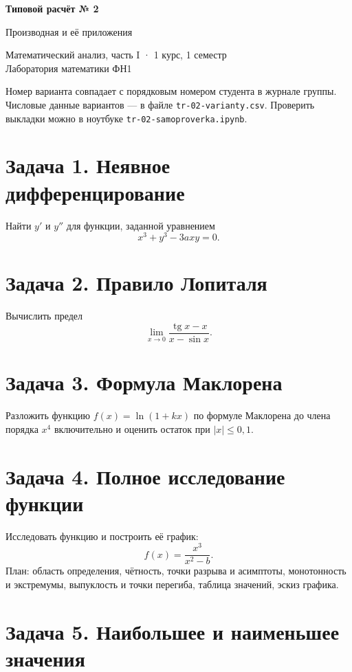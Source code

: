 \documentclass[12pt, a4paper]{article}
\begin{document}
\begin{center}
  {\large\bfseries Типовой расчёт № 2}

  \vspace{0.3em}
  {\large Производная и её приложения}

  \vspace{0.5em}
  {\small Математический анализ, часть I · 1 курс, 1 семестр\\
  Лаборатория математики ФН1}
\end{center}

\vspace{1em}

\noindent
Номер варианта совпадает с порядковым номером студента в журнале группы.
Числовые данные вариантов — в файле \texttt{tr-02-varianty.csv}.
Проверить выкладки можно в ноутбуке \texttt{tr-02-samoproverka.ipynb}.

\section*{Задача 1. Неявное дифференцирование}

Найти $y'$ и $y''$ для функции, заданной уравнением
\[
x^3 + y^3 - 3axy = 0.
\]

\section*{Задача 2. Правило Лопиталя}

Вычислить предел
\[
\lim_{x\to 0}\frac{\operatorname{tg} x - x}{x - \sin x}.
\]

\section*{Задача 3. Формула Маклорена}

Разложить функцию $f(x) = \ln(1 + kx)$ по формуле Маклорена до члена
порядка $x^4$ включительно и оценить остаток при $|x| \le 0{,}1$.

\section*{Задача 4. Полное исследование функции}

Исследовать функцию и построить её график:
\[
f(x) = \frac{x^3}{x^2 - b}.
\]
План: область определения, чётность, точки разрыва и асимптоты, монотонность
и экстремумы, выпуклость и точки перегиба, таблица значений, эскиз графика.

\section*{Задача 5. Наибольшее и наименьшее значения}
\end{document}
